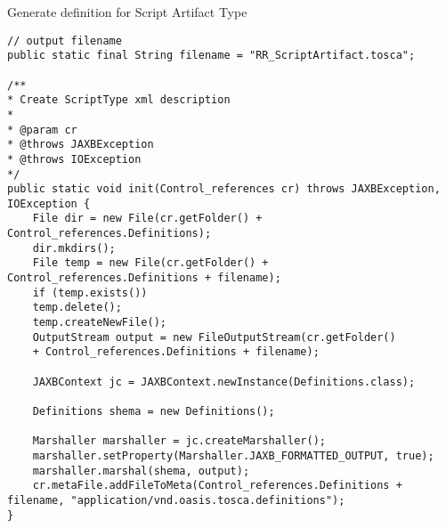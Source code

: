 \begin{Listing} 
	\caption{Generate definition for Script Artifact Type}
	\label{lst:scripttype_create}
	\begin{lstlisting}
// output filename
public static final String filename = "RR_ScriptArtifact.tosca";

/**
* Create ScriptType xml description
* 
* @param cr
* @throws JAXBException
* @throws IOException
*/
public static void init(Control_references cr) throws JAXBException,
IOException {
	File dir = new File(cr.getFolder() + Control_references.Definitions);
	dir.mkdirs();
	File temp = new File(cr.getFolder() + Control_references.Definitions + filename);
	if (temp.exists())
	temp.delete();
	temp.createNewFile();
	OutputStream output = new FileOutputStream(cr.getFolder()
	+ Control_references.Definitions + filename);
	
	JAXBContext jc = JAXBContext.newInstance(Definitions.class);
	
	Definitions shema = new Definitions();
	
	Marshaller marshaller = jc.createMarshaller();
	marshaller.setProperty(Marshaller.JAXB_FORMATTED_OUTPUT, true);
	marshaller.marshal(shema, output);
	cr.metaFile.addFileToMeta(Control_references.Definitions + filename, "application/vnd.oasis.tosca.definitions");
}
\end{lstlisting}
\end{Listing}
